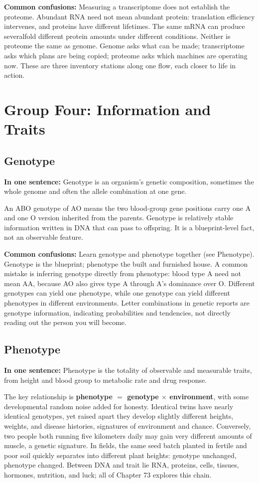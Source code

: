 \textbf{Common confusions:} Measuring a transcriptome does not establish the proteome. Abundant RNA need not mean abundant protein: translation efficiency intervenes, and proteins have different lifetimes. The same mRNA can produce severalfold different protein amounts under different conditions. Neither is proteome the same as genome. Genome asks what can be made; transcriptome asks which plans are being copied; proteome asks which machines are operating now. These are three inventory stations along one flow, each closer to life in action.

\section{Group Four: Information and Traits}

\subsection{Genotype}

\textbf{In one sentence:} Genotype is an organism's genetic composition, sometimes the whole genome and often the allele combination at one gene.

An ABO genotype of AO means the two blood-group gene positions carry one A and one O version inherited from the parents. Genotype is relatively stable information written in DNA that can pass to offspring. It is a blueprint-level fact, not an observable feature.

\textbf{Common confusions:} Learn genotype and phenotype together (see Phenotype). Genotype is the blueprint; phenotype the built and furnished house. A common mistake is inferring genotype directly from phenotype: blood type A need not mean AA, because AO also gives type A through A's dominance over O. Different genotypes can yield one phenotype, while one genotype can yield different phenotypes in different environments. Letter combinations in genetic reports are genotype information, indicating probabilities and tendencies, not directly reading out the person you will become.

\subsection{Phenotype}

\textbf{In one sentence:} Phenotype is the totality of observable and measurable traits, from height and blood group to metabolic rate and drug response.

The key relationship is \textbf{phenotype $=$ genotype $\times$ environment}, with some developmental random noise added for honesty. Identical twins have nearly identical genotypes, yet raised apart they develop slightly different heights, weights, and disease histories, signatures of environment and chance. Conversely, two people both running five kilometers daily may gain very different amounts of muscle, a genetic signature. In fields, the same seed batch planted in fertile and poor soil quickly separates into different plant heights: genotype unchanged, phenotype changed. Between DNA and trait lie RNA, proteins, cells, tissues, hormones, nutrition, and luck; all of Chapter 73 explores this chain.

